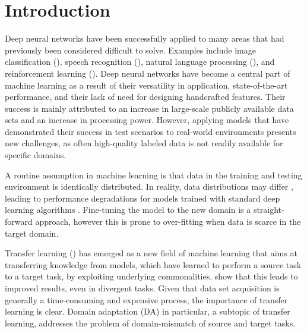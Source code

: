\chapter{Introduction}



Deep neural networks 
have been successfully applied to many areas 
that had previously been considered difficult to solve. 
Examples include 
image classification (\cite{Image_recognition}), 
speech recognition (\cite{Speech_recognition}), 
natural language processing (\cite{gpt3}),
and reinforcement learning (\cite{AlphaZero}).
Deep neural networks have become a central part of machine learning
as a result of their versatility in application, state-of-the-art performance,
and their lack of need for designing handcrafted features.
Their success is mainly attributed to an increase in large-scale publicly available
data sets and an increase in processing power.
However, applying models that have demonstrated their success in test scenarios 
to real-world environments presents new challenges, 
as often high-quality labeled data is not readily available for specific domains.

A routine assumption in machine learning is that data 
in the training and testing environment is identically distributed. 
In reality, data distributions may differ \cite{},
leading to performance degradations for models trained with 
standard deep learning algorithms \cite{}.
Fine-tuning the model to the new domain 
is a straight-forward approach,
however this is prone to over-fitting when data is scarce in the target domain.

Transfer learning (\cite{XFER_SURVEY}) has emerged as a new field of machine learning
that aims 
at transferring knowledge from models, 
which have learned to perform a source task 
to a target task, by exploiting underlying commonalities.
\cite{DA_how_transferable} show that 
this leads to improved results, even in divergent tasks.
Given that data set acquisition is generally a time-consuming and expensive process,
the importance of transfer learning is clear. 
Domain adaptation (DA) in particular, a subtopic of transfer learning,
addresses the problem of domain-mismatch of source and target tasks.

